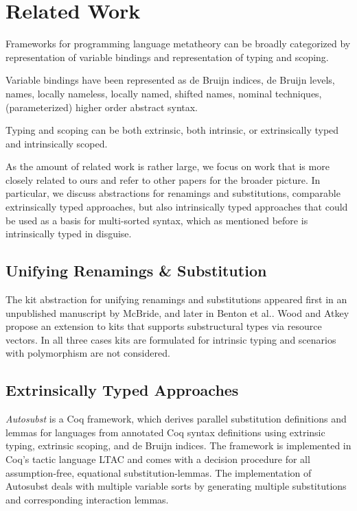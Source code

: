 \documentclass[sigplan,10pt, anonymous]{acmart}
\begin{document}
  \section{Related Work}
  \label{sec:related}

  Frameworks for programming language metatheory can be broadly
  categorized by representation of variable bindings and
  representation of typing and scoping.

  Variable bindings have been represented as de Bruijn indices, de
  Bruijn levels, names, locally nameless, locally named, shifted names,
  nominal techniques, (parameterized) higher order abstract syntax.

  Typing and scoping can be both extrinsic, both intrinsic, or
  extrinsically typed and intrinsically scoped.

  As the amount of related work is rather large, we focus on work that
  is more closely related to ours and refer to other papers for the
  broader picture. In particular, we discuss abstractions for renamings
  and substitutions, comparable extrinsically typed approaches, but also
  intrinsically typed approaches that could be used as a basis for
  multi-sorted syntax, which as mentioned before is intrinsically typed
  in disguise.

  \subsection{Unifying Renamings \& Substitution}

  The kit abstraction for unifying renamings and substitutions
  appeared first in an unpublished manuscript by
  McBride\cite{unpublished:mcbride2005kits}, and later in
  Benton et al.\cite{DBLP:journals/jar/BentonHKM12}. 
  Wood and Atkey\cite{DBLP:journals/corr/abs-2005-02247} propose an
  extension to kits that supports substructural types via resource
  vectors.
  In all three cases kits are formulated for intrinsic typing
  and scenarios with polymorphism are not considered.

  \subsection{Extrinsically Typed Approaches}

  \emph{Autosubst}\cite{DBLP:conf/itp/SchaferTS15}
  is a Coq framework, which derives parallel substitution definitions and
  lemmas for languages from annotated Coq syntax definitions using
  extrinsic typing, extrinsic scoping, and de Bruijn indices.
  The framework is implemented in Coq's tactic language LTAC and comes
  with a decision procedure for all assumption-free, equational
  substitution-lemmas.
  The implementation of Autosubst deals with multiple variable sorts
  by generating multiple substitutions and corresponding interaction lemmas.
\end{document}
